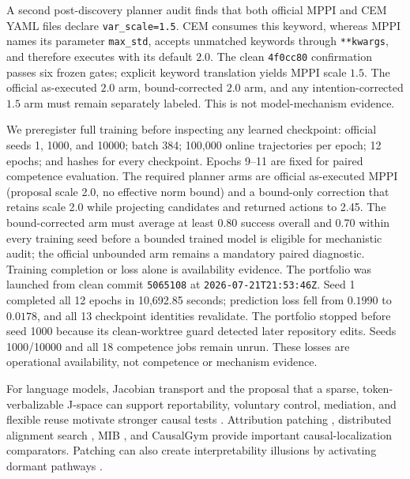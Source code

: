 \documentclass[10pt]{article}
\newcommand{\code}[1]{\texttt{#1}}
\begin{document}
A second post-discovery planner audit finds that both official MPPI and CEM
YAML files declare \code{var\_scale=1.5}.  CEM consumes this keyword, whereas
MPPI names its parameter \code{max\_std}, accepts unmatched keywords through
\code{**kwargs}, and therefore executes with its default $2.0$.  The clean
\code{4f0cc80} confirmation passes six frozen gates; explicit keyword
translation yields MPPI scale $1.5$.  The official as-executed $2.0$ arm,
bound-corrected $2.0$ arm, and any intention-corrected $1.5$ arm must remain
separately labeled.  This is not model-mechanism evidence.

We preregister full training before inspecting any learned checkpoint: official
seeds 1, 1000, and 10000; batch 384; 100,000 online trajectories per epoch;
12 epochs; and hashes for every checkpoint.  Epochs 9--11 are fixed for paired
competence evaluation.  The required planner arms are official as-executed
MPPI (proposal scale 2.0, no effective norm bound) and a bound-only correction
that retains scale 2.0 while projecting candidates and returned actions to
2.45.  The bound-corrected arm must average at least 0.80 success overall and
0.70 within every training seed before a bounded trained model is eligible for
mechanistic audit; the official unbounded arm remains a mandatory paired diagnostic.
Training completion or loss alone is availability evidence.  The portfolio was
launched from clean commit \code{5065108} at
\code{2026-07-21T21:53:46Z}. Seed 1 completed all 12 epochs in 10,692.85
seconds; prediction loss fell from $0.1990$ to $0.0178$, and all 13 checkpoint
identities revalidate. The portfolio stopped before seed 1000 because its
clean-worktree guard detected later repository edits. Seeds 1000/10000 and all
18 competence jobs remain unrun. These losses are operational availability,
not competence or mechanism evidence.

For language models, Jacobian transport and the proposal that a sparse,
token-verbalizable J-space can support reportability, voluntary control,
mediation, and flexible reuse motivate stronger causal tests
\cite{gurnee2026workspacearticle,gurnee2026verbalizable,anthropic2026jacobianlens}.
Attribution patching \cite{kramar2024atpstar}, distributed alignment search
\cite{geiger2024das}, MIB \cite{mueller2025mib}, and CausalGym
\cite{arora2024causalgym} provide important causal-localization comparators.
Patching can also create interpretability illusions by activating dormant
pathways \cite{makelov2023patchingillusion}.
\end{document}
